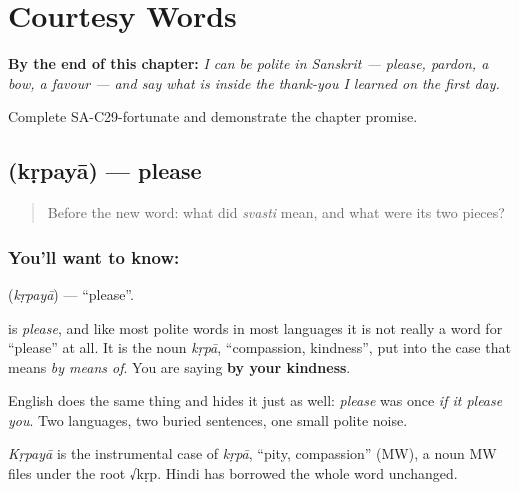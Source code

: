 
\chapter{Courtesy Words}
\label{ch:sa-courtesy}

\begin{chapteropening}
\textbf{By the end of this chapter:} \emph{I can be polite in Sanskrit --- please, pardon, a bow, a favour --- and say what is inside the thank-you I learned on the first day.}

Complete SA-C29-fortunate and demonstrate the chapter promise.
\end{chapteropening}

\section[\texorpdfstring{\sk{कृपया} (kṛpayā)}{कृपया (kṛpayā)}]{ (kṛpayā) — please}

\label{lesson:SA-C29-please}



\begin{quote}
Before the new word: what did \emph{svasti} mean, and what were its two pieces?
\end{quote}

\subsection*{You'll want to know: }
\textbf{} (\emph{kṛpayā}) — \textquotedblleft{}please\textquotedblright{}.

\textbf{} is \emph{please}, and like most polite words in most languages it is not really a word for \textquotedblleft{}please\textquotedblright{} at all. It is the noun \emph{kṛpā}, \textquotedblleft{}compassion, kindness\textquotedblright{}, put into the case that means \emph{by means of}. You are saying \textbf{by your kindness}.

English does the same thing and hides it just as well: \emph{please} was once \emph{if it please you}. Two languages, two buried sentences, one small polite noise.

\begin{cousinweb}
\emph{Kṛpayā} is the instrumental case of \emph{kṛpā}, \textquotedblleft{}pity, compassion\textquotedblright{} (MW), a noun MW files under the root √kṛp. Hindi has borrowed the whole word unchanged.
\end{cousinweb}

